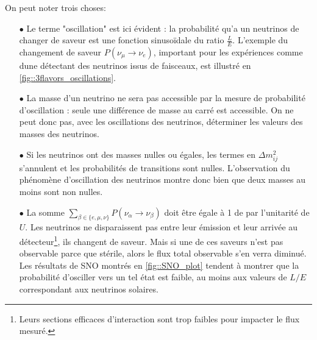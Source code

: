             On peut noter trois choses:
            \begin{itemize}
                \item[$\bullet$] Le terme "oscillation" est ici évident : la probabilité qu'a un neutrinos de changer de saveur est une fonction sinusoïdale du ratio $\frac{L}{E}$. L'exemple du changement de saveur $P(\nu_{\mu}\to\nu_e)$, important pour les expériences comme \gls{dune} détectant des neutrinos issus de faisceaux, est illustré en \autoref{fig::3flavors_oscillations}.
                \item[$\bullet$] La masse d'un neutrino ne sera pas accessible par la mesure de probabilité d'oscillation : seule une différence de masse au carré est accessible. On ne peut donc pas, avec les oscillations des neutrinos, déterminer les valeurs des masses des neutrinos.
                \item[$\bullet$] Si les neutrinos ont des masses nulles ou égales, les termes en $\Delta m_{ij}^2$ s'annulent et les probabilités de transitions sont nulles. L'observation du phénomène d'oscillation des neutrinos montre donc bien que deux masses au moins sont non nulles.
                \item[$\bullet$] La somme $\sum_{\beta\in\{e,\mu,\nu\}}P(\nu_{\alpha}\to\nu_{\beta})$ doit être égale à 1 de par l'unitarité de $U$. Les neutrinos ne disparaissent pas entre leur émission et leur arrivée au détecteur\footnote{Leurs sections efficaces d'interaction sont trop faibles pour impacter le flux mesuré.}, ils changent de saveur. Mais si une de ces saveurs n'est pas observable parce que stérile, alors le flux total observable s'en verra diminué. Les résultats de SNO montrés en \autoref{fig::SNO_plot} tendent à montrer que la probabilité d'osciller vers un tel état est faible, au moins aux valeurs de $L/E$ correspondant aux neutrinos solaires.
            \end{itemize}
            
